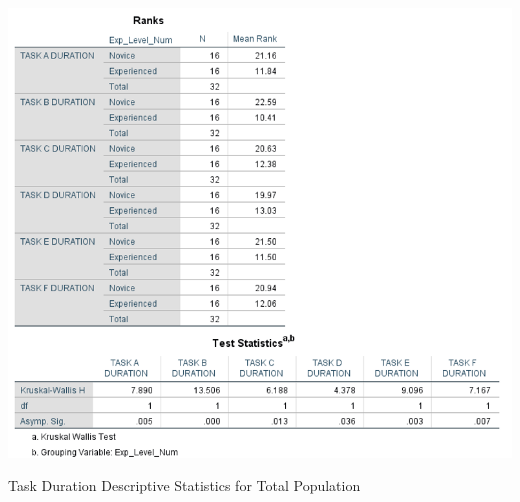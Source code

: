 





\begin{table}[H]
\includegraphics[width=\linewidth]{Screenshots/UXResearchDataFiles/UXTaskDurationData/taskDurationOverallStatsKWEdited.png}
\label{DescriptiveDurationTotalKW}
\caption{Task Duration Descriptive Statistics for Total Population}
\end{table}

